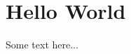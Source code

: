 \documentclass[main.tex]{subfiles}
\begin{document}
\chapter{Hello World}
Some text here...
\end{document}
